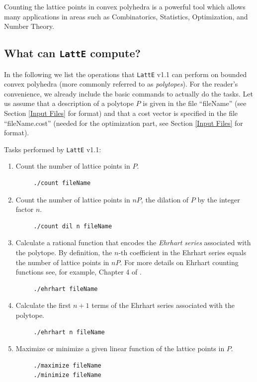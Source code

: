 \documentclass{article}
\begin{document}
Counting the lattice points in convex polyhedra is a powerful tool which 
allows many applications in areas such as Combinatorics, Statistics, 
Optimization, and Number Theory. 

\subsection{What can {\tt LattE} compute?}

In the following we list the operations that {\tt LattE} v1.1 can
perform on bounded convex polyhedra (more commonly referred to as 
\textit{polytopes}). For the reader's convenience, we already include
the basic commands to actually do the tasks. Let us assume that a
description of a polytope $P$ is given in the file ``fileName'' (see
Section \ref{Input Files} for format) and that a cost vector is
specified in the file ``fileName.cost'' (needed for the optimization
part, see Section \ref{Input Files} for format).

Tasks performed by {\tt LattE} v1.1:
\begin{enumerate}
\item Count the number of lattice points in $P$.
\begin{verbatim}
     ./count fileName
\end{verbatim} 
\item Count the number of lattice points in $nP$, the dilation of $P$
  by the integer factor $n$.
\begin{verbatim}
     ./count dil n fileName
\end{verbatim} 
\item Calculate a rational function that encodes the \textit{Ehrhart
  series} associated with the polytope. By definition, the $n$-th
  coefficient in the Ehrhart series equals the number of lattice
  points in $nP$. For more details on Ehrhart counting functions see,
  for example, Chapter 4 of \cite{stanley}. 
\begin{verbatim}
     ./ehrhart fileName
\end{verbatim} 
\item Calculate the first $n+1$ terms of the Ehrhart series associated
  with the polytope.  
\begin{verbatim}
     ./ehrhart n fileName
\end{verbatim} 
\item Maximize or minimize a given linear function of the lattice
  points in $P$.
\begin{verbatim}
     ./maximize fileName
     ./minimize fileName
\end{verbatim} 
\end{enumerate}	
\end{document}
